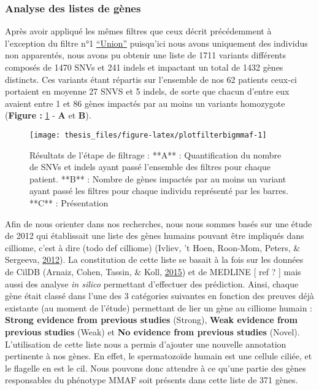 \documentclass[12pt,twoside]{reedthesis}
\theoremstyle{definition}
\theoremstyle{definition}
\theoremstyle{remark}
\begin{document}
  \newpage
  
  \subsubsection{Analyse des listes de
  gènes}\label{analyse-des-listes-de-genes}
  
  Après avoir appliqué les mêmes filtres que ceux décrit précédemment à
  l'exception du filtre n°1
  \protect\hyperlink{filterdescription}{``Union''} puisqu'ici nous avons
  uniquement des individus non apparentés, nous avons pu obtenir une liste
  de 1711 variants différents composés de 1470 SNVs et 241 indels et
  impactant un total de 1432 gènes distincts. Ces variants étant répartis
  sur l'ensemble de nos 62 patients ceux-ci portaient en moyenne 27 SNVS
  et 5 indels, de sorte que chacun d'entre eux avaient entre 1 et 86 gènes
  impactés par au moins un variants homozygote (\textbf{Figure :
  }\ref{fig:plotfilterbigmmaf} - \textbf{A} et \textbf{B}).
  
  \begin{figure}
  
  {\centering \texttt{[image: thesis\_files/figure-latex/plotfilterbigmmaf-1]} 
  
  }
  
  \caption[Résultats de l'étape de filtrage]{Résultats de l'étape de filtrage : **A** : Quantification du nombre de SNVs et indels ayant passé l'ensemble des filtres pour chaque patient. **B** : Nombre de gènes impactés par au moins un variant ayant passé les filtres pour chaque individu représenté par les barres. **C** : Présentation }\label{fig:plotfilterbigmmaf}
  \end{figure}
  
  \newpage
  
  Afin de nous orienter dans nos recherches, nous nous sommes basés sur
  une étude de 2012 qui établissait une liste des gènes humains pouvant
  être impliqués dans cilliome, c'est à dire (todo def cilliome) (Ivliev,
  't Hoen, Roon-Mom, Peters, \& Sergeeva,
  \protect\hyperlink{ref-Ivliev2012}{2012}). La constitution de cette
  liste se basait à la fois sur les données de CilDB (Arnaiz, Cohen,
  Tassin, \& Koll, \protect\hyperlink{ref-Arnaiz2015}{2015}) et de MEDLINE
  {[} ref ? {]} mais aussi des analyse \emph{in silico} permettant
  d'effectuer des prédiction. Ainsi, chaque gène était classé dans l'une
  des 3 catégories suivantes en fonction des preuves déjà existante (au
  moment de l'étude) permettant de lier un gène au cilliome humain :
  \textbf{Strong evidence from previous studies} (Strong), \textbf{Weak
  evidence from previous studies} (Weak) et \textbf{No evidence from
  previous studies} (Novel). L'utilisation de cette liste nous a permis
  d'ajouter une nouvelle annotation pertinente à nos gènes. En effet, le
  spermatozoïde humain est une cellule ciliée, et le flagelle en est le
  cil. Nous pouvons donc attendre à ce qu'une partie des gènes
  responsables du phénotype MMAF soit présents dans cette liste de 371
  gènes.
  
\end{document}
